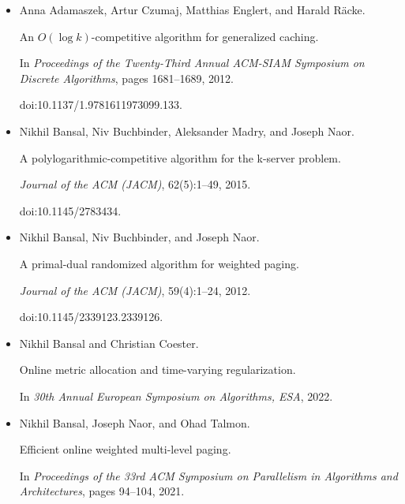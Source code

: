 \begin{itemize}


\item[] 
[1]

Anna Adamaszek, Artur Czumaj, Matthias Englert, and Harald Räcke.


An $O(\log k)$-competitive algorithm for generalized caching.


In \emph{Proceedings of the Twenty-Third Annual ACM-SIAM Symposium on
Discrete Algorithms}, pages 1681–1689, 2012.


doi:10.1137/1.9781611973099.133.





\item[] 
[2]

Nikhil Bansal, Niv Buchbinder, Aleksander Madry, and Joseph Naor.


A polylogarithmic-competitive algorithm for the k-server problem.


\emph{Journal of the ACM (JACM)}, 62(5):1–49, 2015.


doi:10.1145/2783434.





\item[] 
[3]

Nikhil Bansal, Niv Buchbinder, and Joseph Naor.


A primal-dual randomized algorithm for weighted paging.


\emph{Journal of the ACM (JACM)}, 59(4):1–24, 2012.


doi:10.1145/2339123.2339126.





\item[] 
[4]

Nikhil Bansal and Christian Coester.


Online metric allocation and time-varying regularization.


In \emph{30th Annual European Symposium on Algorithms, ESA}, 2022.





\item[] 
[5]

Nikhil Bansal, Joseph Naor, and Ohad Talmon.


Efficient online weighted multi-level paging.


In \emph{Proceedings of the 33rd ACM Symposium on Parallelism in
Algorithms and Architectures}, pages 94–104, 2021.






\end{itemize}
